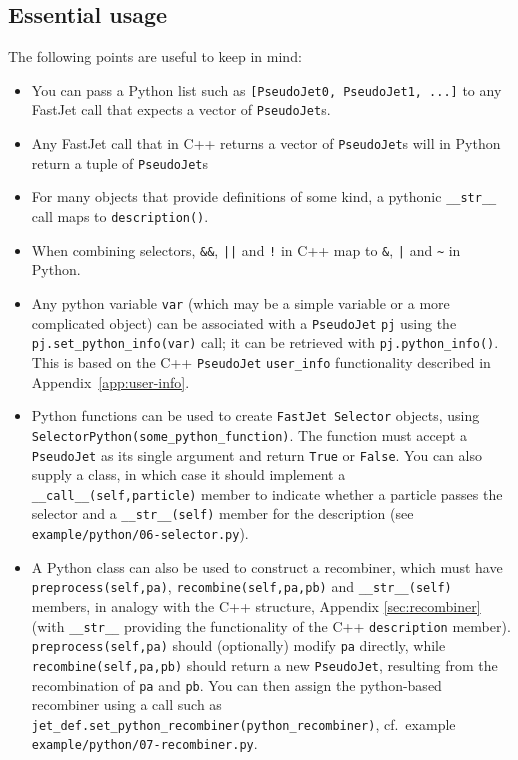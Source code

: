 \documentclass[12pt,a4]{article}
\newcommand{\fastjet}{\texttt{FastJet}\xspace}
\newcommand{\ttt}[1]{{\small\texttt{#1}}}
\begin{document}
\subsection{Essential usage}
\label{sec:python-essential-usage}

The following points are useful to keep in mind:
\begin{itemize}
\item You can pass a Python list such as \ttt{[PseudoJet0, PseudoJet1,
    ...]}  to any FastJet call that expects a vector of
  \ttt{PseudoJet}s.

\item Any FastJet call that in C++ returns a vector of \ttt{PseudoJet}s will
  in Python return a tuple of \ttt{PseudoJet}s

\item For many objects that provide definitions of some kind, a
  pythonic \ttt{\_\_str\_\_} call maps to \ttt{description()}.

\item When combining selectors, \ttt{\&\&}, \ttt{||} and \ttt{!} in
  C++ map to \ttt{\&}, \ttt{|} and \ttt{\~} in Python.

\item Any python variable \ttt{var} (which may be a simple variable or
  a more complicated object) can be associated with a \ttt{PseudoJet}
  \ttt{pj} using
  the \ttt{pj.set\_python\_info(var)} call; it can be retrieved with
  \ttt{pj.python\_info()}.
  This is based on the C++ \ttt{PseudoJet} \ttt{user\_info}
  functionality described in Appendix~\ref{app:user-info}.

\item Python functions can be used to create \fastjet\ \ttt{Selector}
  objects, using \ttt{SelectorPython(some\_python\_function)}. The
  function must accept a \ttt{PseudoJet} as its single argument and
  return \ttt{True} or \ttt{False}.
  You can also supply a class, in which case it should implement a
  \ttt{\_\_call\_\_(self,particle)} member to indicate whether a
  particle passes the selector and a \ttt{\_\_str\_\_(self)} member
  for the description (see \ttt{example/python/06-selector.py}).
  
\item A Python class can also be used to construct a recombiner, which
  must have \ttt{preprocess(self,pa)}, \ttt{recombine(self,pa,pb)} and
  \ttt{\_\_str\_\_(self)} members, in analogy with the C++ structure,
  Appendix \ref{sec:recombiner} (with \ttt{\_\_str\_\_} providing the
  functionality of the C++ \ttt{description} member).
  \ttt{preprocess(self,pa)} should (optionally) modify \ttt{pa}
  directly, while \ttt{recombine(self,pa,pb)} should return a new
  \ttt{PseudoJet}, resulting from the recombination of \ttt{pa} and
  \ttt{pb}.
  You can then assign the python-based recombiner using a call such as
  \ttt{jet\_def.set\_python\_recombiner(python\_recombiner)}, cf.\
  example \ttt{example/python/07-recombiner.py}.


\end{itemize}
\end{document}
